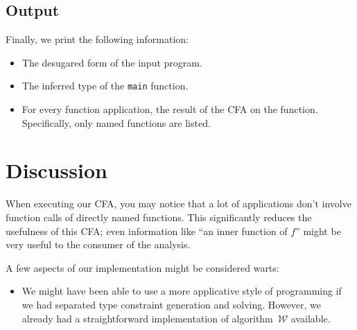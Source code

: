 \documentclass[a4paper]{scrartcl}
\newcommand{\algow}{algorithm~$\mathcal{W}$}
\begin{document}
\subsection{Output}
Finally, we print the following information:
\begin{itemize}
\item The desugared form of the input program.
\item The inferred type of the \texttt{main} function.
\item For every function application, the result of the CFA on the function.
    Specifically, only named functions are listed.
\end{itemize}

\section{Discussion}
When executing our CFA, you may notice that a lot of applications don't involve
function calls of directly named functions. This significantly reduces the
usefulness of this CFA; even information like ``an inner function of $f$''
might be very useful to the consumer of the analysis.

A few aspects of our implementation might be considered warts:
\begin{itemize}
\item
    We might have been able to use a more applicative style of programming
    if we had separated type constraint generation and solving. However,
    we already had a straightforward implementation of \algow{} available.
\end{itemize}
\end{document}
